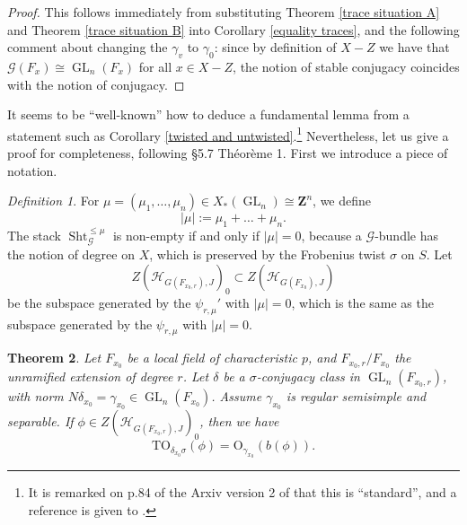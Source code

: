 \documentclass[reqno]{amsart}
\numberwithin{equation}{section}
\newcommand{\Z}{\mathbf{Z}}
\newcommand{\Cal}[1]{\mathcal{#1}}
\newcommand{\mrm}[1]{\mathrm{#1}}
\DeclareMathOperator{\GL}{GL}
\DeclareMathOperator{\Sht}{Sht}
\newtheorem{thm}{Theorem}[section]
\theoremstyle{remark}
\newtheorem{defn}[thm]{Definition}
\numberwithin{equation}{section}
\begin{document}
\begin{proof}
This follows immediately from substituting Theorem \ref{trace situation A} and Theorem \ref{trace situation B} into Corollary \ref{equality traces}, and the following comment about changing the $\gamma_v$ to $\gamma_0$: since by definition of $X-Z$ we have that $\Cal{G}(F_x) \cong \GL_n(F_x)$ for all $x \in X-Z$, the notion of stable conjugacy coincides with the notion of conjugacy. 
\end{proof}


It seems to be  ``well-known'' how to deduce a fundamental lemma from a statement such as Corollary \ref{twisted and untwisted}.\footnote{It is remarked on p.84 of the Arxiv version 2 of \cite{Ngo06} that this is ``standard'', and a reference is given to \cite{Clo90}.} Nevertheless, let us give a proof for completeness, following \cite{Ngo06} \S 5.7 Th\'{e}or\`{e}me 1. First we introduce a piece of notation. 

\begin{defn}
For $\mu  = (\mu_1, \ldots, \mu_n) \in X_*(\GL_n) \cong \Z^n$, we define 
\[
|\mu| := \mu_1 + \ldots + \mu_n.
\]
The stack $\Sht_{\Cal{G}}^{\leq \mu}$ is non-empty if and only if $|\mu|=0$, because a $\Cal{G}$-bundle has the notion of degree on $X$, which is preserved by the Frobenius twist $\sigma$ on $S$. Let 
\[
Z(\Cal{H}_{G(F_{x_0,r}),J})_0 \subset Z(\Cal{H}_{G(F_{x_0}),J})
\] 
be the subspace generated by the $\psi_{r,\mu}'$ with $|\mu| =0$, which is the same as the subspace generated by the $\psi_{r,\mu}$ with $|\mu|=0$. 
\end{defn}

\begin{thm}
Let $F_{x_0}$ be a local field of characteristic $p$, and $F_{x_0,r}/F_{x_0}$ the unramified extension of degree $r$. Let $\delta$ be a $\sigma$-conjugacy class in $\GL_n(F_{x_0,r})$, with norm $N \delta_{x_0} = \gamma_{x_0} \in \GL_n(F_{x_0})$. Assume $\gamma_{x_0}$ is regular semisimple and separable. If $\phi \in Z(\Cal{H}_{G(F_{x_0,r}),J})_0$, then we have
\[
\mrm{TO}_{\delta_{x_0} \sigma }(\phi) = \mrm{O}_{\gamma_{x_0}}(b(\phi)).
\]
\end{thm}
\end{document}
